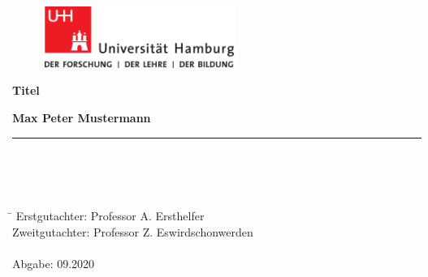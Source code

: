 \begin{titlepage}
	
	\setcounter{page}{-1}
	
	\begin{figure}[h]
		\begin{minipage}[b]{62mm}
			\includegraphics[width=62mm]{images/unilogo}
		\end{minipage}
		\hspace{4cm}
	\end{figure}
	
	\vfill
	
	\begin{center}
		\vspace{14mm}
		\noindent \textbf{\huge
			Titel
		}
		\vspace{60mm}	
	\end{center}
	
	\vfill
	
	\noindent \textbf{Max Peter Mustermann} \\
	\noindent \rule{\textwidth}{0.4mm} 
	 \\
	 \\
	 \\
	\begin{tabbing}
		\hspace{8em} \=  \kill
		Erstgutachter: \> Professor A. Ersthelfer \\
		Zweitgutachter: \> Professor Z. Eswirdschonwerden \\
		~ \\
		Abgabe: 09.2020
	\end{tabbing}
	
	\newpage 
	\thispagestyle{empty}
	\setcounter{page}{0}
	
\end{titlepage}

